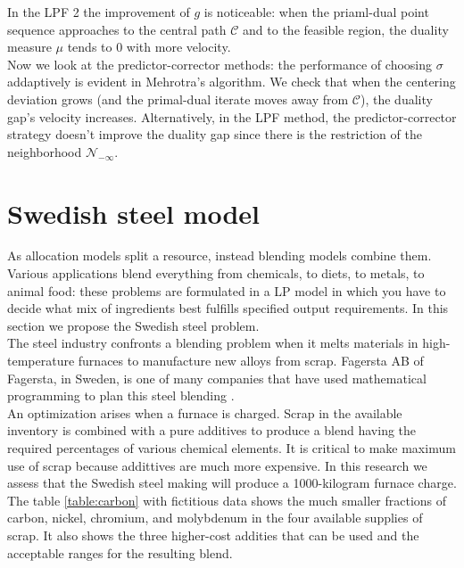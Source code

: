 \documentclass[a4paper,10 pt,titlepage,twoside]{book}
\theoremstyle{plain}
\theoremstyle{definition}
\theoremstyle{remark}
\begin{document}
In the LPF 2 the improvement of $g$ is noticeable: when the priaml-dual point sequence approaches to the central path $\mathcal{C}$ and to the feasible region, the duality measure $\mu$ tends to 0 with more velocity.\\ 
Now we look at the predictor-corrector methods: the performance of choosing $\sigma$ addaptively is evident in Mehrotra's algorithm.
We check that when the centering deviation grows (and the primal-dual iterate moves away from $\mathcal{C}$), the duality gap's velocity increases. Alternatively, in the LPF method, the predictor-corrector strategy doesn't improve the duality gap since there is the restriction of the neighborhood $\mathcal{N}_{-\infty}$.
\section{Swedish steel model}
As allocation models split a resource, instead blending models combine them. Various applications blend everything from chemicals, to diets, to metals, to animal food: these problems are formulated in a LP model in which you have to decide what mix of ingredients best fulfills specified output requirements. In this section we propose the Swedish steel problem.\\
The steel industry confronts a blending problem when it melts materials in high-temperature furnaces to manufacture new alloys from scrap. Fagersta AB of Fagersta, in Sweden, is one of many companies that have used mathematical programming to plan this steel blending \cite{SSM}.\\
An optimization arises when a furnace is charged. Scrap in the available inventory is combined with a pure additives to produce a blend having the required percentages of various chemical elements. It is critical to make maximum use of scrap because addittives are much more expensive. In this research we assess that the Swedish steel making will produce a 1000-kilogram furnace charge. The table \ref{table:carbon} with fictitious data shows the much smaller fractions of carbon, nickel, chromium, and molybdenum in the four available supplies of scrap. It also shows the three higher-cost addities that can be used and the acceptable ranges for the resulting blend.\\
\end{document}
